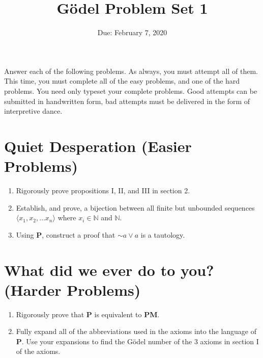 \documentclass{article}
\title{G\"odel Problem Set 1}
\date{Due: February 7, 2020}
\begin{document}
\maketitle

Answer each of the following problems.  As always, you must attempt
all of them.  This time, you must complete all of the easy problems,
and one of the hard problems.  You need only typeset your complete
problems.  Good attempts can be submitted in handwritten form, bad
attempts must be delivered in the form of interpretive dance.

\section{Quiet Desperation (Easier Problems)}
\begin{enumerate}
    \item Rigorously prove propositions I, II, and III in section 2.
    \item Establish, and prove, a bijection between all finite but 
        unbounded
        sequences  $\langle x_1, x_2, \ldots x_n \rangle$ where $x_i
        \in \mathbb{N}$ and $\mathbb{N}$.
    \item Using \textbf{P}, construct a proof that $\sim a \vee a$ is
        a tautology.
\end{enumerate}

\section{What did we ever do to you? (Harder Problems)}
\begin{enumerate}
    \item Rigorously prove that \textbf{P} is equivalent to
        \textbf{PM}.
    \item Fully expand all of the abbreviations used in the axioms 
       into the language of \textbf{P}.  Use your expansions to find
       the G\"odel number of the 3 axioms in section I of the axioms.
\end{enumerate}
\end{document}
